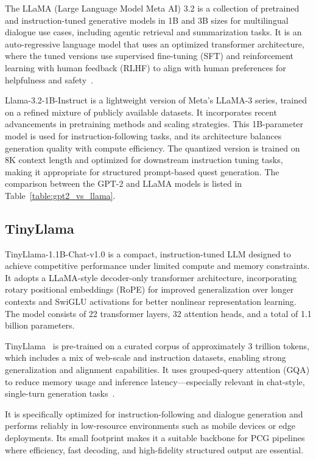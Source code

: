 The LLaMA (Large Language Model Meta AI) 3.2 is a collection of pretrained and
instruction-tuned generative models in 1B and 3B sizes for multilingual dialogue use
cases, including agentic retrieval and summarization tasks. It is an auto-regressive language
model that uses an optimized transformer architecture, where the tuned versions use
supervised fine-tuning (SFT) and reinforcement learning with human feedback (RLHF)
to align with human preferences for helpfulness and safety~\cite{dao2023flashattention2,touvron2023llama}.

Llama-3.2-1B-Instruct is a lightweight version of Meta's LLaMA-3 series, trained on
a refined mixture of publicly available datasets. It incorporates recent advancements
in pretraining methods and scaling strategies. This 1B-parameter model is used for
instruction-following tasks, and its architecture balances generation quality with compute
efficiency. The quantized version is trained on 8K context length and optimized for
downstream instruction tuning tasks, making it appropriate for structured prompt-based
quest generation. The comparison between the GPT-2 and LLaMA models is listed in
Table~\ref{table:gpt2_vs_llama}.

\subsection{TinyLlama}

TinyLlama-1.1B-Chat-v1.0 is a compact, instruction-tuned LLM designed to achieve competitive
performance under limited compute and memory constraints. It adopts a LLaMA-style
decoder-only transformer architecture, incorporating rotary positional embeddings
(RoPE) for improved generalization over longer contexts and SwiGLU activations for
better nonlinear representation learning. The model consists of 22 transformer layers, 32
attention heads, and a total of 1.1 billion parameters.

TinyLlama~\cite{zhang2024tinyllama} is pre-trained on a curated corpus of approximately 3 trillion tokens,
which includes a mix of web-scale and instruction datasets, enabling strong generalization
and alignment capabilities. It uses grouped-query attention (GQA) to reduce memory
usage and inference latency—especially relevant in chat-style, single-turn generation
tasks~\cite{lit-gpt,dao2023flashattention2}.

It is specifically optimized for instruction-following and dialogue generation and performs
reliably in low-resource environments such as mobile devices or edge deployments.
Its small footprint makes it a suitable backbone for PCG pipelines where efficiency, fast
decoding, and high-fidelity structured output are essential.

